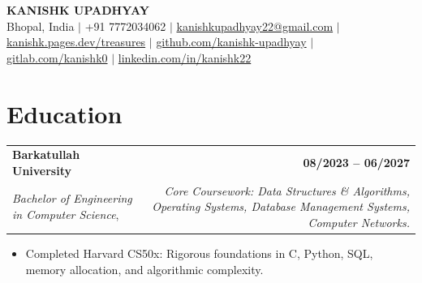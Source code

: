 \documentclass[9.5pt,letterpaper]{article}
\begin{document}
\begin{center}
  {\fontsize{16}{18}\selectfont \textbf{KANISHK UPADHYAY}} \\[2pt]
  {\footnotesize Bhopal, India $|$ +91 7772034062 $|$ \href{mailto:kanishkupadhyay22@gmail.com}{kanishkupadhyay22@gmail.com} $|$ \href{https://kanishk.pages.dev/treasures}{kanishk.pages.dev/treasures} $|$ \href{https://github.com/kanishk-upadhyay}{github.com/kanishk-upadhyay} $|$ \href{https://gitlab.com/kanishk0}{gitlab.com/kanishk0} $|$ \href{https://linkedin.com/in/kanishk22}{linkedin.com/in/kanishk22}}
\end{center}
\vspace{-6pt}

\section{Education}
\noindent\begin{tabular*}{\textwidth}{@{\extracolsep{\fill}}lr}
  \textbf{Barkatullah University} & \textbf{08/2023 -- 06/2027} \\
  \textit{Bachelor of Engineering in Computer Science},  & \textit{Core Coursework: Data Structures \& Algorithms, Operating Systems, Database Management Systems, Computer Networks.} \\
\end{tabular*}\vspace{-2pt}
\begin{itemize}
  \item Completed Harvard CS50x: Rigorous foundations in C, Python, SQL, memory allocation, and algorithmic complexity.
\end{itemize}
\end{document}
